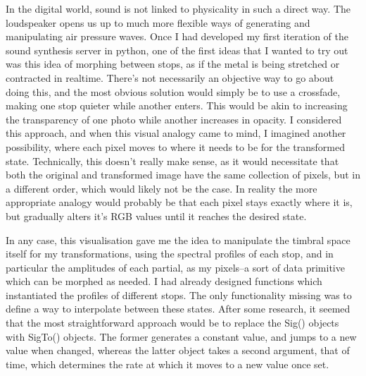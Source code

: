 \documentclass[12pt,twoside,maitrise]{dms_ks}
\theoremstyle{definition}
\begin{document}
{In the digital world, sound is not linked to physicality in such a direct way.
The loudspeaker opens us up to much more flexible ways of generating and manipulating air pressure waves.
Once I had developed my first iteration of the sound synthesis server in python, one of the first ideas that I wanted to try out was this idea of morphing between stops, as if the metal is being stretched or contracted in realtime.
There's not necessarily an objective way to go about doing this, and the most obvious solution would simply be to use a crossfade, making one stop quieter while another enters.
This would be akin to increasing the transparency of one photo while another increases in opacity.
I considered this approach, and when this visual analogy came to mind, I imagined another possibility, where each pixel moves to where it needs to be for the transformed state.
Technically, this doesn't really make sense, as it would necessitate that both the original and transformed image have the same collection of pixels, but in a different order, which would likely not be the case.
In reality the more appropriate analogy would probably be that each pixel stays exactly where it is, but gradually alters it's RGB values until it reaches the desired state.

In any case, this visualisation gave me the idea to manipulate the timbral space itself for my transformations, using the spectral profiles of each stop, and in particular the amplitudes of each partial, as my pixels--a sort of data primitive which can be morphed as needed.
I had already designed functions which instantiated the profiles of different stops.
The only functionality missing was to define a way to interpolate between these states.
After some research, it seemed that the most straightforward approach would be to replace the Sig() objects with SigTo() objects.
The former generates a constant value, and jumps to a new value when changed, whereas the latter object takes a second argument, that of time, which determines the rate at which it moves to a new value once set.

}
\end{document}
